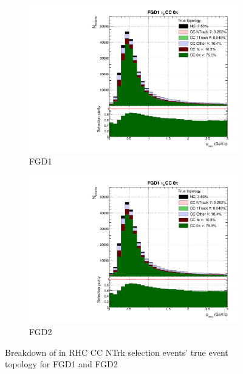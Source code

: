 \begin{figure}[!h]
	\begin{subfigure}[t]{0.49\textwidth}
		\includegraphics[width=\textwidth,page=23, trim={0mm 0mm 0mm 9mm}, clip]{figures/mach3/selection/2017b_Diag_WithSelection}
		\caption{FGD1}
	\end{subfigure}
	\begin{subfigure}[t]{0.49\textwidth}
		\includegraphics[width=\textwidth,page=27, trim={0mm 0mm 0mm 9mm}, clip]{figures/mach3/selection/2017b_Diag_WithSelection}
		\caption{FGD2}
	\end{subfigure}
	\caption{Breakdown of \numu in RHC CC NTrk selection events' true event topology for FGD1 and FGD2 }
	\label{fig:ccnubarnuNtrk_topology}
\end{figure}

